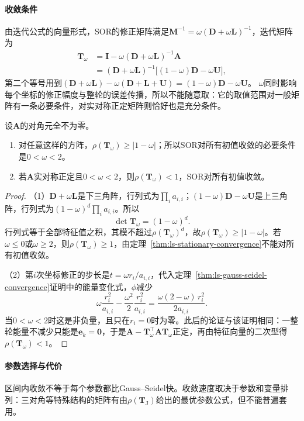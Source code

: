 \paragraph{收敛条件}
由迭代公式的向量形式，SOR的修正矩阵满足$\bm M^{-1}=\omega(\bm D+\omega\bm L)^{-1}$，迭代矩阵为
\begin{equation}
\begin{aligned}
\bm T_\omega&=\bm I-\omega(\bm D+\omega\bm L)^{-1}\bm A\\
&=(\bm D+\omega\bm L)^{-1}\bigl[(1-\omega)\bm D-\omega\bm U\bigr],
\end{aligned}
 \label{eq:ls-sor-iteration-matrix}
\end{equation}
第二个等号用到$(\bm D+\omega\bm L)-\omega(\bm D+\bm L+\bm U)=(1-\omega)\bm D-\omega\bm U$。
$\omega$同时影响每个坐标的修正幅度与整轮的误差传播，所以不能随意取：它的取值范围对一般矩阵有一条必要条件，对实对称正定矩阵则恰好也是充分条件。
\begin{theorem}[SOR迭代的收敛条件]
\label{thm:ls-sor-convergence}
设$\bm A$的对角元全不为零。
\begin{enumerate}
\item 对任意这样的方阵，$\rho(\bm T_\omega)\geq|1-\omega|$；所以SOR对所有初值收敛的必要条件是$0<\omega<2$。
\item 若$\bm A$实对称正定且$0<\omega<2$，则$\rho(\bm T_\omega)<1$，SOR对所有初值收敛。
\end{enumerate}
\end{theorem}
\begin{proof}
（1）$\bm D+\omega\bm L$是下三角阵，行列式为$\prod_i a_{i,i}$；$(1-\omega)\bm D-\omega\bm U$是上三角阵，行列式为$(1-\omega)^d\prod_i a_{i,i}$。所以
\[
 \det\bm T_\omega=(1-\omega)^d .
\]
行列式等于全部特征值之积，其模不超过$\rho(\bm T_\omega)^d$，故$\rho(\bm T_\omega)\geq|1-\omega|$。若$\omega\leq0$或$\omega\geq2$，则$\rho(\bm T_\omega)\geq1$，由定理~\ref{thm:ls-stationary-convergence}不能对所有初值收敛。

（2）第$i$次坐标修正的步长是$t=\omega r_i/a_{i,i}$，代入定理~\ref{thm:ls-gauss-seidel-convergence}证明中的能量变化式，$\phi$减少
\[
\omega\frac{r_i^2}{a_{i,i}}-\frac{\omega^2}{2}\frac{r_i^2}{a_{i,i}}=\frac{\omega(2-\omega)\,r_i^2}{2a_{i,i}} .
\]
当$0<\omega<2$时这是非负量，且只在$r_i=0$时为零。此后的论证与该证明相同：一整轮能量不减少只能是$\bm e_k=\bm0$，于是$\bm A-\bm T_\omega^\top\bm A\bm T_\omega$正定，再由特征向量的二次型得$\rho(\bm T_\omega)<1$。
\end{proof}

\paragraph{参数选择与代价}
区间内收敛不等于每个参数都比Gauss--Seidel快。收敛速度取决于参数和变量排列：三对角等特殊结构的矩阵有由$\rho(\bm T_{\mathrm J})$给出的最优参数公式，但不能普遍套用。

